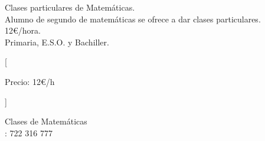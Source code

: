 \documentclass[letterpaper]{article}
\begin{document}
\thispagestyle{empty} \pagestyle{empty}
\begin{center}
  $\quad$
\vspace{120mm}\\
\Huge Clases particulares de Matemáticas.
\tiny
$$
\quad
$$
\Huge Alumno de segundo de matemáticas se ofrece a dar clases particulares.
\tiny
$$
\quad
$$
\Huge 12€/hora.
\tiny
$$
\quad
$$
\Huge Primaria, E.S.O. y Bachiller.
\end{center}
\stubs[15]{3cm}[{\raggedright Precio: 12€/h\\}]%
  {\raggedright Clases de Matemáticas \\ \faMobile: 722 316 777}
\end{document}
